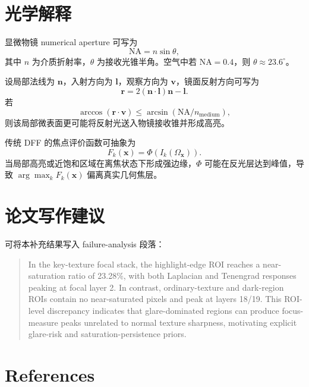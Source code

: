 \documentclass[11pt,a4paper]{ctexart}
\begin{document}
\section{光学解释}

显微物镜 numerical aperture 可写为
\begin{equation}
\mathrm{NA}=n\sin\theta,
\end{equation}
其中 $n$ 为介质折射率，$\theta$ 为接收光锥半角。空气中若 $\mathrm{NA}=0.4$，则 $\theta\approx23.6^\circ$。

设局部法线为 $\mathbf{n}$，入射方向为 $\mathbf{l}$，观察方向为 $\mathbf{v}$，镜面反射方向可写为
\begin{equation}
\mathbf{r}=2(\mathbf{n}\cdot\mathbf{l})\mathbf{n}-\mathbf{l}.
\end{equation}
若
\begin{equation}
\arccos(\mathbf{r}\cdot\mathbf{v}) \leq \arcsin(\mathrm{NA}/n_{\mathrm{medium}}),
\end{equation}
则该局部微表面更可能将反射光送入物镜接收锥并形成高亮。

传统 DFF 的焦点评价函数可抽象为
\begin{equation}
F_k(\mathbf{x})=\Phi(I_k(\Omega_\mathbf{x})).
\end{equation}
当局部高亮或近饱和区域在离焦状态下形成强边缘，$\Phi$ 可能在反光层达到峰值，导致 $\arg\max_k F_k(\mathbf{x})$ 偏离真实几何焦层。

\section{论文写作建议}

可将本补充结果写入 failure-analysis 段落：

\begin{quote}
In the key-texture focal stack, the highlight-edge ROI reaches a near-saturation ratio of 23.28\%, with both Laplacian and Tenengrad responses peaking at focal layer 2. In contrast, ordinary-texture and dark-region ROIs contain no near-saturated pixels and peak at layers 18/19. This ROI-level discrepancy indicates that glare-dominated regions can produce focus-measure peaks unrelated to normal texture sharpness, motivating explicit glare-risk and saturation-persistence priors.
\end{quote}

\section{References}
\end{document}
